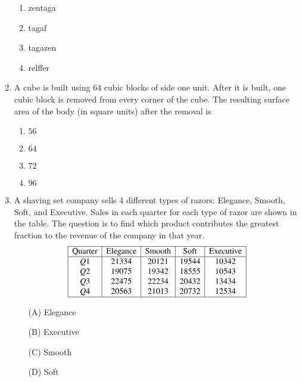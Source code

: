 \documentclass[journal,12pt,onecolumn]{IEEEtran}
\theoremstyle{remark}
\begin{document}
\begin{enumerate}
\begin{enumerate}
    \item zentaga
    \item tagaf
    \item tagazen
    \item relffer
\end{enumerate}

\item A cube is built using $64$ cubic blocks of side one unit. After it is built, one cubic block is removed from every corner of the cube. The resulting surface area of the body (in square units) after the removal is 
\begin{enumerate}
    \item $56$
    \item $64$
    \item $72$
    \item $96$
\end{enumerate}

\item A shaving set company sells 4 different types of razors: Elegance, Smooth, Soft, and Executive. Sales in each quarter for each type of razor are shown in the table. The question is to find which product contributes the greatest fraction to the revenue of the company in that year.
\[
\begin{array}{|c|c|c|c|c|}
\hline
\text{Quarter} & \text{Elegance} & \text{Smooth} & \text{Soft} & \text{Executive} \\
\hline
Q1 & 21334 & 20121 & 19544 & 10342 \\
Q2 & 19075 & 19342 & 18555 & 10543 \\
Q3 & 22475 & 22234 & 20432 & 13434 \\
Q4 & 20563 & 21013 & 20732 & 12534 \\
\hline
\end{array}
\]
\begin{enumerate}
    \item[(A)] Elegance
    \item[(B)] Executive
    \item[(C)] Smooth
    \item[(D)] Soft
\end{enumerate}


\end{enumerate}
\end{document}
